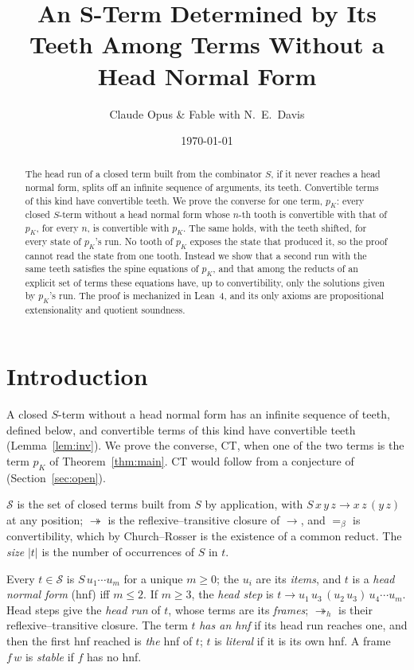 \documentclass[11pt]{amsart}
\title[An $S$-Term Determined by Its Teeth]{An $\bm{S}$-Term Determined by Its Teeth Among Terms Without a Head Normal Form}
\author{Claude Opus \& Fable with N.\ E.\ Davis}
\date{\today}
\theoremstyle{definition}
\newcommand{\Ter}{\mathcal S}
\newcommand{\red}{\twoheadrightarrow}
\newcommand{\hred}{\twoheadrightarrow_h}
\newcommand{\conv}{=_\beta}
\newcommand{\sz}[1]{\lvert#1\rvert}
\newcommand{\pK}{p_K}
\begin{document}
\begin{abstract}
The head run of a closed term built from the combinator $S$, if it never reaches a head normal
form, splits off an infinite sequence of arguments, its teeth. Convertible terms of this kind have
convertible teeth. We prove the converse for one term, $p_K$: every closed $S$-term without a head
normal form whose $n$-th tooth is convertible with that of $p_K$, for every $n$, is convertible with
$p_K$. The same holds, with the teeth shifted, for every state of $p_K$'s run. No tooth of $p_K$
exposes the state that produced it, so the proof cannot read the state from one tooth. Instead we
show that a second run with the same teeth satisfies the spine equations of $p_K$, and that among
the reducts of an explicit set of terms these equations have, up to convertibility, only the
solutions given by $p_K$'s run. The proof is mechanized in Lean~4, and its only axioms are
propositional extensionality and quotient soundness.
\end{abstract}

\maketitle

\section{Introduction}

A closed $S$-term without a head normal form has an infinite sequence of teeth, defined below, and
convertible terms of this kind have convertible teeth (Lemma~\ref{lem:inv}). We prove the converse,
CT, when one of the two terms is the term $\pK$ of Theorem~\ref{thm:main}. CT would follow from a
conjecture of~\citep{s6} (Section~\ref{sec:open}).

$\Ter$ is the set of closed terms built from $S$ by application, with $S\,x\,y\,z\to x\,z\,(y\,z)$ at
any position; $\red$ is the reflexive--transitive closure of $\to$, and $\conv$ is convertibility,
which by Church--Rosser is the existence of a common reduct. The \emph{size} $\sz t$ is the number of
occurrences of $S$ in $t$.

Every $t\in\Ter$ is $S\,u_1\cdots u_m$ for a unique $m\ge0$; the $u_i$ are its \emph{items}, and $t$
is a \emph{head normal form} (hnf) iff $m\le2$. If $m\ge3$, the \emph{head step} is
$t\to u_1\,u_3\,(u_2\,u_3)\,u_4\cdots u_m$. Head steps give the \emph{head run} of $t$, whose terms
are its \emph{frames}; $\hred$ is their reflexive--transitive closure. The term $t$ \emph{has an hnf} if its
head run reaches one, and then the first hnf reached is \emph{the} hnf of $t$; $t$ is \emph{literal} if
it is its own hnf. A frame $f\,w$ is \emph{stable} if $f$ has no hnf.
\end{document}
